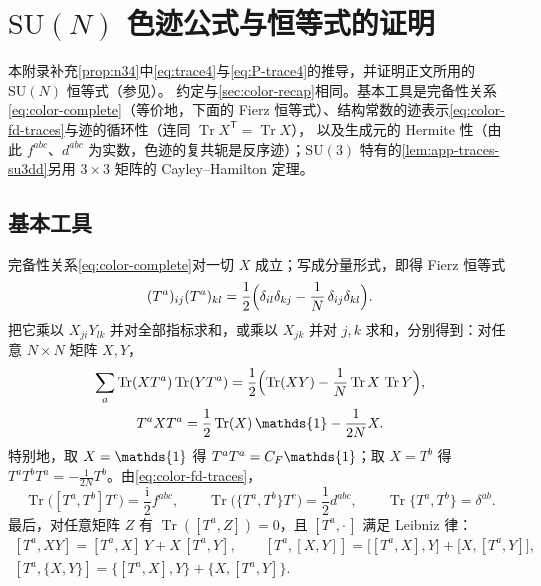 \documentclass[UTF8,a4paper,11pt,fontset=fandol]{ctexart}
\let\amsmathbb\mathbb
\renewcommand{\mathbb}[1]{\ifx1#1\mathds{1}\else\amsmathbb{#1}\fi}
\theoremstyle{cplain}
\theoremstyle{cdefinition}
\theoremstyle{cremark}
\numberwithin{equation}{section}
\DeclareMathOperator{\Tr}{Tr}
\newcommand{\tp}{\mathsf{T}}                         %
\newcommand{\ii}{\mathrm{i}}                        %
\begin{document}
\section{\texorpdfstring{$\mathrm{SU}(N)$}{SU(N)} 色迹公式与恒等式的证明}\label{app:traces}

本附录补充\cref{prop:n34}中\cref{eq:trace4}与\cref{eq:P-trace4}的推导，并证明正文所用的 $\mathrm{SU}(N)$ 恒等式（参见\cite{Haber2021,MacfarlaneSudberyWeisz1968}）。
约定与\cref{sec:color-recap}相同。基本工具是完备性关系\cref{eq:color-complete}（等价地，下面的 Fierz 恒等式）、结构常数的迹表示\cref{eq:color-fd-traces}与迹的循环性（连同 $\Tr X^{\tp}=\Tr X$），
以及生成元的 Hermite 性（由此 $f^{abc}$、$d^{abc}$ 为实数，色迹的复共轭是反序迹）；$\mathrm{SU}(3)$ 特有的\cref{lem:app-traces-su3dd}另用 $3\times3$ 矩阵的 Cayley--Hamilton 定理。

\subsection{基本工具}\label{sec:app-traces-tools}

完备性关系\cref{eq:color-complete}对一切 $X$ 成立；写成分量形式，即得 Fierz 恒等式
\begin{equation}\label{eq:app-traces-fierz}
(T^a)_{ij}(T^a)_{kl}=\frac12\Bigl(\delta_{il}\delta_{kj}-\frac1N\,\delta_{ij}\delta_{kl}\Bigr).
\end{equation}
把它乘以 $X_{ji}Y_{lk}$ 并对全部指标求和，或乘以 $X_{jk}$ 并对 $j,k$ 求和，分别得到：对任意 $N\times N$ 矩阵 $X,Y$，
\begin{gather}
\sum_a\Tr(XT^a)\Tr(YT^a)=\frac12\Bigl(\Tr(XY)-\frac1N\Tr X\,\Tr Y\Bigr),\label{eq:app-traces-fierz-tr}\\
T^aXT^a=\frac12\Tr(X)\,\mathbb 1-\frac1{2N}X .\label{eq:app-traces-TXT}
\end{gather}
特别地，取 $X=\mathbb 1$ 得 $T^aT^a=C_F\mathbb 1$；取 $X=T^b$ 得 $T^aT^bT^a=-\frac1{2N}T^b$。由\cref{eq:color-fd-traces}，
\begin{equation}\label{eq:app-traces-basic}
\Tr\bigl([T^a,T^b]T^c\bigr)=\frac{\ii}{2}f^{abc},\qquad \Tr\bigl(\{T^a,T^b\}T^c\bigr)=\frac12d^{abc},\qquad\Tr\{T^a,T^b\}=\delta^{ab}.
\end{equation}
最后，对任意矩阵 $Z$ 有 $\Tr([T^a,Z])=0$，且 $[T^a,\cdot\,]$ 满足 Leibniz 律：
\begin{equation}\label{eq:app-traces-leibniz}
\begin{gathered}
[T^a,XY]=[T^a,X]\,Y+X\,[T^a,Y],\qquad [T^a,[X,Y]]=\bigl[[T^a,X],Y\bigr]+\bigl[X,[T^a,Y]\bigr],\\
[T^a,\{X,Y\}]=\bigl\{[T^a,X],Y\bigr\}+\bigl\{X,[T^a,Y]\bigr\}.
\end{gathered}
\end{equation}
\end{document}
